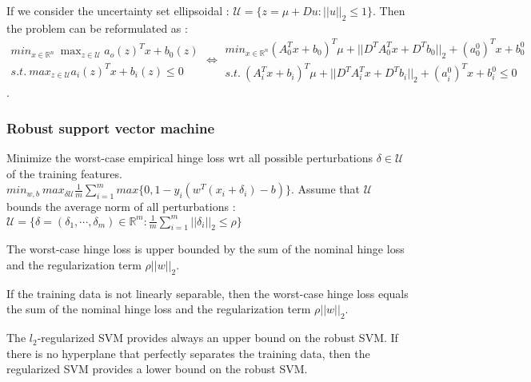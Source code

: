 \documentclass[../main.tex]{subfiles}
\begin{document}
If we consider the uncertainty set ellipsoidal : $\mathcal{U} = \{z = \mu + Du : \lvert\lvert u \rvert\rvert_2 \leq 1\}$. Then the problem can be reformulated as : $\begin{matrix}
    min_{x\in \mathbb{R}^n} \: \max_{z\in \mathcal{U}} a_o(z)^T x + b_0(z)\\
    s.t. \: max_{z\in \mathcal{U}} a_i(z)^T x + b_i(z) \leq 0
\end{matrix} \Leftrightarrow \begin{matrix}
    min_{x\in \mathbb{R}^n} (A_0^T x + b_0)^T \mu + \lvert \lvert D^T A_0^T x + D^T b_0 \rvert\rvert_2 + (a_0^0)^Tx + b_0^0\\
    s.t. \: (A_i^Tx +b_i)^T \mu + \lvert\lvert D^T A_i^T x + D^T b_i \rvert\rvert_2 + (a_i^0)^Tx + b_i^0 \leq 0
\end{matrix}$.\\

\subsubsection{Robust support vector machine}
Minimize the worst-case empirical hinge loss wrt all possible perturbations $\delta \in \mathcal{U}$ of the training features. $min_{w,b} \: max_{\delta \mathcal{U}} \frac{1}{m} \sum_{i=1}^m max\{0,1-y_i(w^T(x_i+\delta_i)-b)\}$. Assume that $\mathcal{U}$ bounds the average norm of all perturbations : $\mathcal{U} = \{\delta = (\delta_1,\cdots, \delta_m) \in \mathbb{R}^m : \frac{1}{m} \sum_{i=1}^m\lvert\lvert\delta_i\rvert\rvert_2\leq \rho \}$\\
\begin{theorem}
    The worst-case hinge loss is upper bounded by the sum of the nominal hinge loss and the regularization term $\rho \lvert\lvert w \rvert\rvert_2$.
\end{theorem}

\begin{theorem}
    If the training data is not linearly separable, then the worst-case hinge loss equals the sum of the nominal hinge loss and the regularization term $\rho \lvert\lvert w \rvert\rvert_2$.
\end{theorem}

The $l_2$-regularized SVM provides always an upper bound on the robust SVM. If there is no hyperplane that perfectly separates the training data, then the regularized SVM provides a lower bound on the robust SVM. \\
\end{document}
